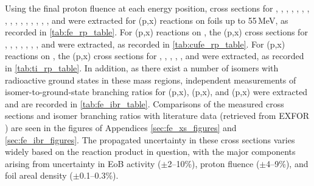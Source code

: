 Using the final proton fluence at each energy position, cross sections for , ,  , , ,  , , , , , , , , , , , and 
 were extracted for (p,x) reactions  on  foils up to 55\,MeV, as recorded in \autoref{tab:fe_rp_table}.
For  (p,x) reactions on , the (p,x) cross sections for  , , ,  , , , , and   were extracted, as recorded in \autoref{tab:cufe_rp_table}.
For  (p,x) reactions on , the (p,x) cross sections for  , , , , , and   were extracted, as recorded in \autoref{tab:ti_rp_table}.
In addition, as there exist a number of isomers with radioactive ground states in these mass regions,  independent measurements of isomer-to-ground-state branching ratios for (p,x), (p,x), and (p,x) were  extracted and are recorded in \autoref{tab:fe_ibr_table}.
Comparisons  of the measured cross sections and isomer branching ratios with literature data (retrieved from EXFOR \cite{Otuka2014272}) are seen in the figures of Appendices \ref{sec:fe_xs_figures} and \ref{sec:fe_ibr_figures}.
The propagated uncertainty in these cross sections varies widely based on the reaction product in question, with the major components  arising from uncertainty in EoB activity ($\pm$2--10\%), proton fluence ($\pm$4--9\%), and foil areal density ($\pm$0.1--0.3\%).





